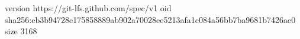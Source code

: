 version https://git-lfs.github.com/spec/v1
oid sha256:eb3b94728e175858889ab902a70028ee5213afa1c084a56bb7ba9681b7426ae0
size 3168
